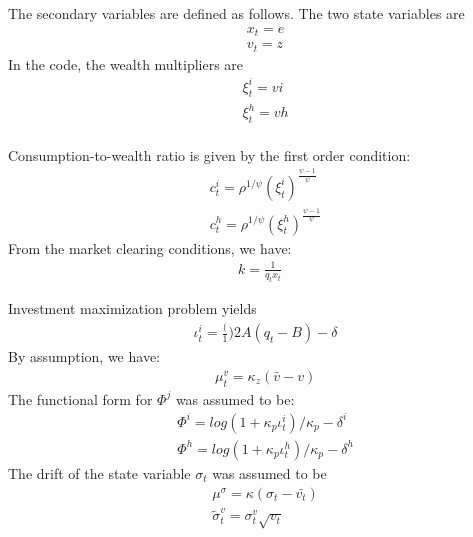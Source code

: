 \documentclass[12pt,english]{article}
\begin{document}
The secondary variables are defined as follows. The two state variables are 
\begin{align}
&x_t = e\\
&v_t = z
\end{align}
In the code, the wealth multipliers are 
\begin{align}
&\xi_t^i = vi\\
&\xi_t^h = vh\\
\end{align}

Consumption-to-wealth ratio is given by the first order condition:
\begin{align}
&c_t^i = \rho^{1/\psi}(\xi_t^i)^{\frac{\psi - 1}{\psi}}\\
&c_t^h =\rho^{1/\psi}(\xi_t^h)^{\frac{\psi - 1}{\psi}}
\end{align}
From the market clearing conditions, we have:
\begin{align}
 k = \frac{1}{q_tx_t}
\end{align}

Investment maximization problem yields
\begin{align}
&\iota_t^i = \frac(1){2A}(q_t - B) - \delta
\end{align}
By assumption, we have:
\begin{align}
	&\mu_t^v = \kappa_z(\bar{v} - v)
\end{align}
The functional form for $\Phi^j$ was assumed to be:
\begin{align}
&\Phi^i = log(1 + \kappa_p\iota_t^i)/\kappa_p - \delta^i\\
&\Phi^h = log(1 + \kappa_p\iota_t^h)/\kappa_p - \delta^h
\end{align}
The drift of the state variable $\sigma_t$ was assumed to be
\begin{align}
&\mu^{\sigma} = \kappa(\sigma_t - \bar{v_t})\\
&\tilde{\sigma}_t^v = \sigma_t^v\sqrt{v_t}
\end{align}
\end{document}
